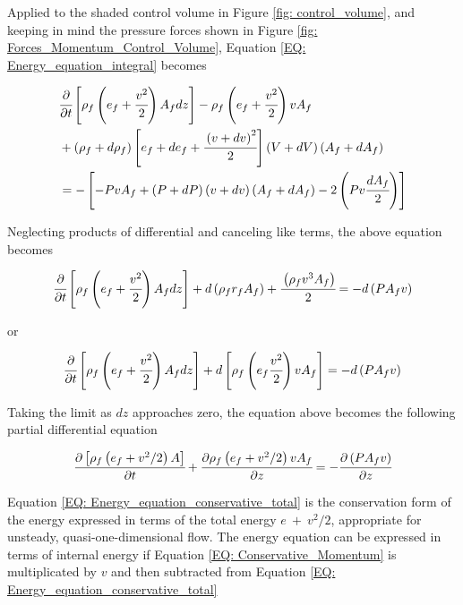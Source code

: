 \documentclass[../Article_Design_of_Experiment.tex]{subfiles}
\begin{document}
	Applied to the shaded control volume in Figure \ref{fig: control_volume}, and keeping in mind the pressure forces shown in Figure \ref{fig: Forces_Momentum_Control_Volume}, Equation \ref{EQ: Energy_equation_integral} becomes
	
	{\footnotesize
		\begin{align}
			&\cfrac{\partial}{\partial t} \left[ \rho_f \left( e_f + \cfrac{v^2}{2} \right) A_f dz \right] - \rho_f \left( e_f + \cfrac{v^2}{2} \right) v A_f \nonumber \\
			&+ \left( \rho_f + d\rho_f \right) \left[ e_f + de_f + \cfrac{\left( v + dv \right)^2}{2} \right] \left( V+dV \right) \left( A_f+dA_f \right) \nonumber \\
			&= - \left[ -PvA_f + \left(P+dP\right) \left(v+dv\right) \left(A_f+dA_f\right) - 2\left( Pv\cfrac{dA_f}{2} \right) \right]
		\end{align}
	} %
	
	Neglecting products of differential and canceling like terms, the above equation becomes
	
	{\footnotesize
		\begin{equation}
			\cfrac{\partial}{\partial t} \left[ \rho_f \left( e_f + \cfrac{v^2}{2} \right) A_f dz \right] + d\left( \rho_f r_f A_f \right) + \cfrac{ \left( \rho_f v^3 A_f \right) }{2} = -d \left( P A_f v \right)
		\end{equation}
	}

	or
	
	{\footnotesize
		\begin{equation}
			\cfrac{\partial}{\partial t} \left[ \rho_f \left( e_f + \cfrac{v^2}{2} \right) A_f dz \right] + d \left[ \rho_f \left( e_f \cfrac{v^2}{2} \right) vA_f \right] = - d\left( P A_f v \right)
		\end{equation}
	}

	Taking the limit as $dz$ approaches zero, the equation above becomes the following partial differential equation
	
	{\footnotesize
		\begin{equation}
			\cfrac{\partial \left[ \rho_f \left( e_f + v^2 / 2 \right) A \right]}{\partial t} + \cfrac{\partial \rho_f \left( e_f + v^2 / 2 \right)vA_f}{\partial z} = -\cfrac{\partial \left( P A_f v \right)}{\partial z}
			\label{EQ: Energy_equation_conservative_total}
		\end{equation}
	}
	
	Equation \ref{EQ: Energy_equation_conservative_total} is the conservation form of the energy expressed in terms of the total energy $e~+~v^2/2$, appropriate for unsteady, quasi-one-dimensional flow. The energy equation can be expressed in terms of internal energy if Equation \ref{EQ: Conservative_Momentum} is multiplicated by $v$ and then subtracted from Equation \ref{EQ: Energy_equation_conservative_total}
	
\end{document}
